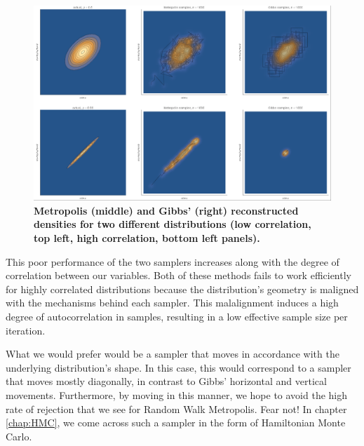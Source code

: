 \documentclass[11pt,fullpage]{book}
\begin{document}
\begin{figure}
\centerline{\includegraphics[width=1\textwidth]{Gibbs_correlationProblemCrime.png}}
\caption{\textbf{Metropolis (middle) and Gibbs' (right) reconstructed densities for two different distributions (low correlation, top left, high correlation, bottom left panels).}}\label{fig:Gibbs_correlationProblemCrime}
\end{figure}

This poor performance of the two samplers increases along with the degree of correlation between our variables. Both of these methods fails to work efficiently for highly correlated distributions because the distribution's geometry is maligned with the mechanisms behind each sampler. This malalignment induces a high degree of autocorrelation in samples, resulting in a low effective sample size per iteration.

What we would prefer would be a sampler that moves in accordance with the underlying distribution's shape. In this case, this would correspond to a sampler that moves mostly diagonally, in contrast to Gibbs' horizontal and vertical movements. Furthermore, by moving in this manner, we hope to avoid the high rate of rejection that we see for Random Walk Metropolis. Fear not! In chapter \ref{chap:HMC}, we come across such a sampler in the form of Hamiltonian Monte Carlo. 
\end{document}
